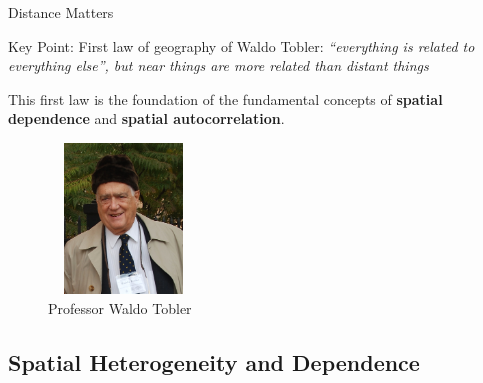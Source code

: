 \documentclass[english,10pt]{beamer}\usepackage[]{graphicx}\usepackage[]{xcolor}
\begin{document}
\begin{frame}{Distance Matters}
\begin{alertblock}{Key Point:}
First law of geography of Waldo Tobler: \emph{``everything is related to everything else'', but near things are more related than distant things}
\end{alertblock}

This first law is the foundation of the fundamental concepts of \textbf{spatial dependence} and \textbf{spatial autocorrelation}.

\begin{figure}
	\caption{Professor Waldo Tobler}
\centering
	\includegraphics[width=4cm, height=4cm]{Waldo_Tobler}
\end{figure}

\end{frame}

\subsection{Spatial Heterogeneity and Dependence}
\end{document}
